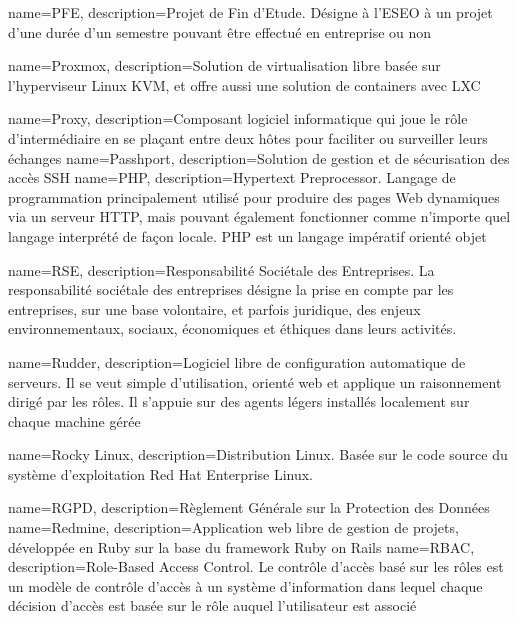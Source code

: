{
    name=PFE,
    description={Projet de Fin d'Etude. Désigne à l'ESEO à un projet d'une durée d'un semestre pouvant être effectué en entreprise ou non}
}

{
    name=Proxmox,
    description={Solution de virtualisation libre basée sur l'hyperviseur Linux KVM, et offre aussi une solution de containers avec LXC}
}

{
    name=Proxy,
    description={Composant logiciel informatique qui joue le rôle d'intermédiaire en se plaçant entre deux hôtes pour faciliter ou surveiller leurs échanges}
}
{
    name=Passhport,
    description={Solution de gestion et de sécurisation des accès SSH}
}
{
    name=PHP,
    description={Hypertext Preprocessor. Langage de programmation principalement utilisé pour produire des pages Web dynamiques via un serveur HTTP, mais pouvant également fonctionner comme n'importe quel langage interprété de façon locale. PHP est un langage impératif orienté objet}
}



{
    name=RSE,
    description={Responsabilité Sociétale des Entreprises. La responsabilité sociétale des entreprises désigne la prise en compte par les entreprises, sur une base volontaire, et parfois juridique, des enjeux environnementaux, sociaux, économiques et éthiques dans leurs activités.}
}

{
    name=Rudder,
    description={Logiciel libre de configuration automatique de serveurs. Il se veut simple d'utilisation, orienté web et applique un raisonnement dirigé par les rôles. Il s'appuie sur des agents légers installés localement sur chaque machine gérée}
}

{
    name=Rocky Linux,
    description={Distribution Linux. Basée sur le code source du système d'exploitation Red Hat Enterprise Linux.}
}

{
    name=RGPD,
    description={Règlement Générale sur la Protection des Données}
}
{
    name=Redmine,
    description={Application web libre de gestion de projets, développée en Ruby sur la base du framework Ruby on Rails}
}
{
    name=RBAC,
    description={Role-Based Access Control. Le contrôle d'accès basé sur les rôles est un modèle de contrôle d'accès à un système d'information dans lequel chaque décision d'accès est basée sur le rôle auquel l'utilisateur est associé}
}


